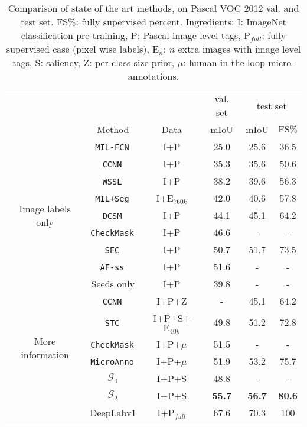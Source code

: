 \documentclass[british,10pt,twocolumn,letterpaper]{article}
\providecommand{\tabularnewline}{\\}
\begin{document}
\begin{table}
\begin{centering}
\begingroup
\setlength{\tabcolsep}{0.15em} 
\begin{tabular}{cccccc}
 &  &  & val. set & \multicolumn{2}{c}{test set}\tabularnewline
 & Method & Data & mIoU & mIoU & $\text{FS}\%$\tabularnewline
\hline 
\hline 
\multirow{9}{*}{\begin{turn}{90}
{\small{}Image labels only}
\end{turn}} & \texttt{MIL-FCN}\,\cite{Pathak2015Iclrw} & $\text{I}$+P & 25.0 & 25.6 & 36.5\tabularnewline
 & \texttt{CCNN}\,\cite{Pathak2015Iccv} & $\text{I}$+P & 35.3 & 35.6 & 50.6\tabularnewline
 & \texttt{WSSL}\,\cite{Papandreou2015Iccv} & $\text{I}$+P & 38.2 & 39.6 & 56.3\tabularnewline
 & \texttt{MIL+Seg}\,\cite{Pinheiro2015Cvpr} & $\text{I}$+$\text{E}_{760k}$ & 42.0 & 40.6 & 57.8\tabularnewline
 & \texttt{DCSM}\,\cite{Shimoda2016Eccv} & $\text{I}$+P & 44.1 & 45.1 & 64.2\tabularnewline
 & \texttt{CheckMask}\,\cite{Saleh2016Eccv} & $\text{I}$+P & 46.6 & - & -\tabularnewline
 & \texttt{SEC}\,\cite{kolesnikov2016seed} & $\text{I}$+P & 50.7 & 51.7 & 73.5\tabularnewline
 & \texttt{AF-ss}\,\cite{Qi2016Eccv} & $\text{I}$+P & 51.6 & - & -\tabularnewline
\cline{2-6} 
 & Seeds only & $\text{I}$+P & 39.8 & - & -\tabularnewline
\hline 
\multirow{6}{*}{\begin{turn}{90}
{\small{}More information}
\end{turn}} & \texttt{CCNN}\,\cite{Pathak2015Iccv} & $\text{I}$+P+Z & - & 45.1 & 64.2\tabularnewline
 & \texttt{STC}\,\cite{Wei2015ArXiv} & $\text{I}$+P+$\text{S}$+$\text{E}_{40k}$ & 49.8 & 51.2 & 72.8\tabularnewline
 & \texttt{CheckMask}\,\cite{Saleh2016Eccv} & $\text{I}$+P+$\mu$ & 51.5 & - & -\tabularnewline
 & \texttt{MicroAnno}\,\cite{Kolesnikov2016Bmvc} & $\text{I}$+P+$\mu$ & 51.9 & 53.2 & 75.7\tabularnewline
\cline{2-6} 
 & $\mathcal{G}_{0}$ & $\text{I}$+P+$\text{S}$ & 48.8 & - & -\tabularnewline
 & $\mathcal{G}_{2}$ & $\text{I}$+P+$\text{S}$ & \textbf{55.7} & \textbf{56.7} & \textbf{80.6}\tabularnewline
\hline 
 & DeepLabv1 & $\text{I}$+$\text{P}_{full}$ & 67.6 & 70.3 & 100\tabularnewline
\end{tabular}\endgroup
\par\end{centering}
\caption{\label{tab:pascal-results-others}Comparison of state of the art methods,
on Pascal VOC 2012 val.\emph{ }and test set. $\text{FS}\%$: fully
supervised percent. Ingredients: $\text{I}$: ImageNet classification
pre-training, P: Pascal image level tags, $\text{P}_{full}$: fully
supervised case (pixel wise labels), $\text{E}_{n}$: $n$ extra images
with image level tags, S: saliency, Z: per-class size prior, $\mu$:
human-in-the-loop micro-annotations.}
\end{table}
\end{document}
